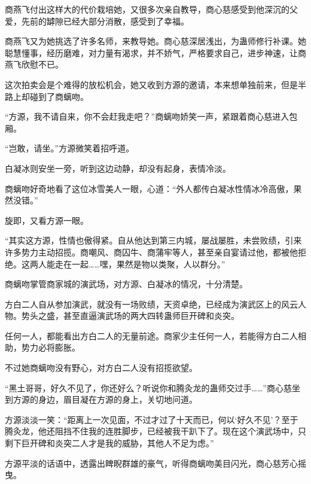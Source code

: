 \begin{this_body}
商燕飞付出这样大的代价栽培她，又很多次亲自教导，商心慈感受到他深沉的父爱，先前的罅隙已经大部分消散，感受到了幸福。

商燕飞又为她挑选了许多名师，来教导她。商心慈深居浅出，为蛊师修行补课。她聪慧懂事，经历磨难，对力量有渴求，并不娇气，严格要求自己，进步神速，让商燕飞欣慰不已。

这次拍卖会是个难得的放松机会，她又收到方源的邀请，本来想单独前来，但是半路上却碰到了商螭吻。

“方源，我不请自来，你不会赶我走吧？”商螭吻娇笑一声，紧跟着商心慈进入包厢。

“岂敢，请坐。”方源微笑着招呼道。

白凝冰则安坐一旁，听到这边动静，却没有起身，表情冷淡。

商螭吻好奇地看了这位冰雪美人一眼，心道：“外人都传白凝冰性情冰冷高傲，果然没错。”

旋即，又看方源一眼。

“其实这方源，性情也傲得紧。自从他达到第三内城，屡战屡胜，未尝败绩，引来许多势力主动招揽。商嘲风、商囚牛、商蒲牢等人，甚至亲自宴请过他，都被他拒绝。这两人能走在一起……嘿，果然是物以类聚，人以群分。”

商螭吻掌管商家城的演武场，对方源、白凝冰的情况，十分清楚。

方白二人自从参加演武，就没有一场败绩，天资卓绝，已经成为演武区上的风云人物。势头之盛，甚至直逼演武场的两大四转蛊师巨开碑和炎突。

任何一人，都能看出方白二人的无量前途。商家少主任何一人，若能得方白二人相助，势力必将膨胀。

不过她商螭吻没有野心，对方白二人没有招揽欲望。

“黑土哥哥，好久不见了，你还好么？听说你和腾灸龙的蛊师交过手……”商心慈坐到方源的身边，眉目凝在方源的身上，关切地问道。

方源淡淡一笑：“距离上一次见面，不过才过了十天而已，何以‘好久不见’？至于腾灸龙，他还阻挡不住我的连胜脚步，已经被我干趴下了。现在这个演武场中，只剩下巨开碑和炎突二人才是我的威胁，其他人不足为虑。”

方源平淡的话语中，透露出睥睨群雄的豪气，听得商螭吻美目闪光，商心慈芳心摇曳。

\end{this_body}

